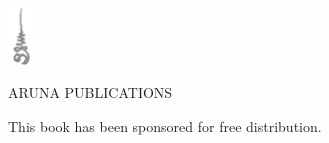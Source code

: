 \documentclass[11pt,oneside,final]{memoir}
\begin{document}
\centering

\mbox{}\vfill

\includegraphics[height=15mm,keepaspectratio]{buddho.jpg}
\vspace*{3mm}

ARUNA PUBLICATIONS
\vspace*{4mm}

This book has been sponsored for free distribution.

\vspace*{9mm}
\end{document}
